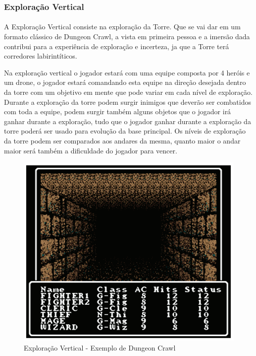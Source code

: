 \documentclass[11pt]{article} %
\begin{document}
\subsubsection{Exploração Vertical}
\paragraph{}A Exploração Vertical consiste na exploração da Torre. Que se vai dar em um formato clássico de Dungeon Crawl, a vista em primeira pessoa e a imersão dada contribui para a experiência de exploração e incerteza, ja que a Torre terá corredores labirintíticos.

Na exploração vertical o jogador estará com uma equipe composta por 4 heróis e um drone, o jogador estará comandando esta equipe na direção desejada dentro da torre com um objetivo em mente que pode variar em cada nível de exploração. Durante a exploração da torre podem surgir inimigos que deverão ser combatidos com toda a equipe, podem surgir também alguns objetos que o jogador irá ganhar durante a exploração, tudo que o jogador ganhar durante a exploração da torre poderá ser usado para evolução da base principal. Os níveis de exploração da torre podem ser comparados aos andares da mesma, quanto maior o andar maior será também a dificuldade do jogador para vencer.

\begin{figure}[!htp]
\centering
\includegraphics[scale=0.3]{res/Dungeon_Crawler.png}
\caption{Exploração Vertical - Exemplo de Dungeon Crawl}
\label{Dungeon Crawler}
\end{figure}
\end{document}
